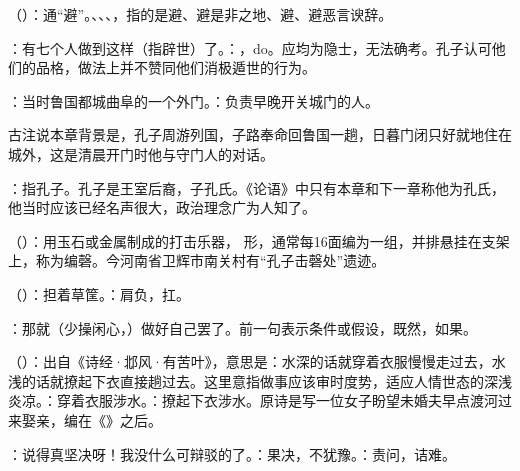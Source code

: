 {
\begin{lyblobitemize}
\item {}（）：通“避”。、、、，指的是避、避是非之地、避、避恶言谀辞。%
\item {}：有七个人做到这样（指辟世）了。：，do。应均为隐士，无法确考。孔子认可他们的品格，做法上并不赞同他们消极遁世的行为。
\end{lyblobitemize}
}
{}


{
\item {}：当时鲁国都城曲阜的一个外门。：负责早晚开关城门的人。

古注说本章背景是，孔子周游列国，子路奉命回鲁国一趟，日暮门闭只好就地住在城外，这是清晨开门时他与守门人的对话。

\item {}：指孔子。孔子是王室后裔，子孔氏。《论语》中只有本章和下一章称他为孔氏，他当时应该已经名声很大，政治理念广为人知了。
}
{}


{
\item {}（）：用玉石或金属制成的打击乐器， 形，通常每16面编为一组，并排悬挂在支架上，称为编磬。今河南省卫辉市南关村有“孔子击磬处”遗迹。
\item {}（）：担着草筐。：肩负，扛。
\item {}：那就（少操闲心，）做好自己罢了。前一句表示条件或假设，既然，如果。
\item {}（）：出自《诗经·邶风·有苦叶》，意思是：水深的话就穿着衣服慢慢走过去，水浅的话就撩起下衣直接趟过去。这里意指做事应该审时度势，适应人情世态的深浅炎凉。：穿着衣服涉水。：撩起下衣涉水。原诗是写一位女子盼望未婚夫早点渡河过来娶亲，编在《》之后。
\item {}：说得真坚决呀！我没什么可辩驳的了。：果决，不犹豫。：责问，诘难。
}
{}  %


